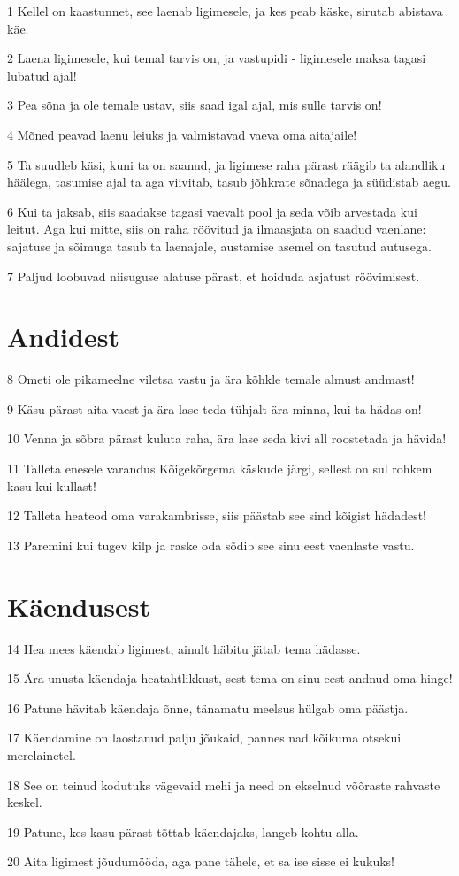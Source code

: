\par 1 Kellel on kaastunnet, see laenab ligimesele, ja kes peab käske, sirutab abistava käe.
\par 2 Laena ligimesele, kui temal tarvis on, ja vastupidi - ligimesele maksa tagasi lubatud ajal!
\par 3 Pea sõna ja ole temale ustav, siis saad igal ajal, mis sulle tarvis on!
\par 4 Mõned peavad laenu leiuks ja valmistavad vaeva oma aitajaile!
\par 5 Ta suudleb käsi, kuni ta on saanud, ja ligimese raha pärast räägib ta alandliku häälega, tasumise ajal ta aga viivitab, tasub jõhkrate sõnadega ja süüdistab aegu.
\par 6 Kui ta jaksab, siis saadakse tagasi vaevalt pool ja seda võib arvestada kui leitut. Aga kui mitte, siis on raha röövitud ja ilmaasjata on saadud vaenlane: sajatuse ja sõimuga tasub ta laenajale, austamise asemel on tasutud autusega.
\par 7 Paljud loobuvad niisuguse alatuse pärast, et hoiduda asjatust röövimisest.

\section*{Andidest}

\par 8 Ometi ole pikameelne viletsa vastu ja ära kõhkle temale almust andmast!
\par 9 Käsu pärast aita vaest ja ära lase teda tühjalt ära minna, kui ta hädas on!
\par 10 Venna ja sõbra pärast kuluta raha, ära lase seda kivi all roostetada ja hävida!
\par 11 Talleta enesele varandus Kõigekõrgema käskude järgi, sellest on sul rohkem kasu kui kullast!
\par 12 Talleta heateod oma varakambrisse, siis päästab see sind kõigist hädadest!
\par 13 Paremini kui tugev kilp ja raske oda sõdib see sinu eest vaenlaste vastu.

\section*{Käendusest}

\par 14 Hea mees käendab ligimest, ainult häbitu jätab tema hädasse.
\par 15 Ära unusta käendaja heatahtlikkust, sest tema on sinu eest andnud oma hinge!
\par 16 Patune hävitab käendaja õnne, tänamatu meelsus hülgab oma päästja.
\par 17 Käendamine on laostanud palju jõukaid, pannes nad kõikuma otsekui merelainetel.
\par 18 See on teinud kodutuks vägevaid mehi ja need on ekselnud võõraste rahvaste keskel.
\par 19 Patune, kes kasu pärast tõttab käendajaks, langeb kohtu alla.
\par 20 Aita ligimest jõudumööda, aga pane tähele, et sa ise sisse ei kukuks!

